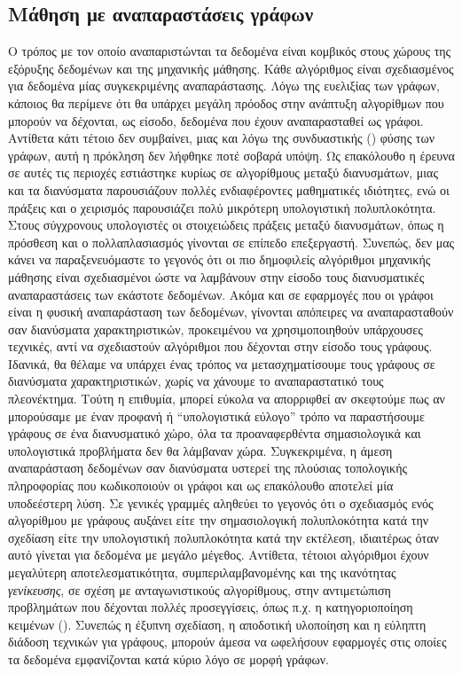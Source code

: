 \subsection{Μάθηση με αναπαραστάσεις γράφων}
Ο τρόπος με τον οποίο αναπαριστώνται τα δεδομένα είναι κομβικός στους χώρους της εξόρυξης δεδομένων και της μηχανικής μάθησης.
Κάθε αλγόριθμος είναι σχεδιασμένος για δεδομένα μίας συγκεκριμένης αναπαράστασης.
Λόγω της ευελιξίας των γράφων, κάποιος θα περίμενε ότι θα υπάρχει μεγάλη πρόοδος στην ανάπτυξη αλγορίθμων που μπορούν να δέχονται, ως είσοδο, δεδομένα που έχουν αναπαρασταθεί ως γράφοι.
Αντίθετα κάτι τέτοιο δεν συμβαίνει, μιας και λόγω της συνδυαστικής () φύσης των γράφων, αυτή η πρόκληση δεν λήφθηκε ποτέ σοβαρά υπόψη.
Ως επακόλουθο η έρευνα σε αυτές τις περιοχές εστιάστηκε κυρίως σε αλγορίθμους μεταξύ διανυσμάτων, μιας και τα διανύσματα παρουσιάζουν πολλές ενδιαφέροντες μαθηματικές ιδιότητες, ενώ οι πράξεις και ο χειρισμός παρουσιάζει πολύ μικρότερη υπολογιστική πολυπλοκότητα. Στους σύγχρονους υπολογιστές οι στοιχειώδεις πράξεις μεταξύ διανυσμάτων, όπως η πρόσθεση και ο πολλαπλασιασμός γίνονται σε επίπεδο επεξεργαστή.
Συνεπώς, δεν μας κάνει να παραξενευόμαστε το γεγονός ότι οι πιο δημοφιλείς αλγόριθμοι μηχανικής μάθησης είναι σχεδιασμένοι ώστε να λαμβάνουν στην είσοδο τους διανυσματικές αναπαραστάσεις των εκάστοτε δεδομένων. 
Ακόμα και σε εφαρμογές που οι γράφοι είναι η φυσική αναπαράσταση των δεδομένων, γίνονται απόπειρες να αναπαρασταθούν σαν διανύσματα χαρακτηριστικών, προκειμένου να χρησιμοποιηθούν υπάρχουσες τεχνικές, αντί να σχεδιαστούν αλγόριθμοι που δέχονται στην είσοδο τους γράφους.
Ιδανικά, θα θέλαμε να υπάρχει ένας τρόπος να μετασχηματίσουμε τους γράφους σε διανύσματα χαρακτηριστικών, χωρίς να χάνουμε το αναπαραστατικό τους πλεονέκτημα.
Τούτη η επιθυμία, μπορεί εύκολα να απορριφθεί αν σκεφτούμε πως αν μπορούσαμε με έναν προφανή ή ``υπολογιστικά εύλογο'' τρόπο να παραστήσουμε γράφους σε ένα διανυσματικό χώρο, όλα τα προαναφερθέντα σημασιολογικά και υπολογιστικά προβλήματα δεν θα λάμβαναν χώρα.
Συγκεκριμένα, η άμεση αναπαράσταση δεδομένων σαν διανύσματα υστερεί της πλούσιας τοπολογικής πληροφορίας που κωδικοποιούν οι γράφοι και ως επακόλουθο αποτελεί μία υποδεέστερη λύση.
Σε γενικές γραμμές αληθεύει το γεγονός ότι ο σχεδιασμός ενός αλγορίθμου με γράφους αυξάνει είτε την σημασιολογική πολυπλοκότητα κατά την σχεδίαση είτε την υπολογιστική πολυπλοκότητα κατά την εκτέλεση, ιδιαιτέρως όταν αυτό γίνεται για δεδομένα με μεγάλο μέγεθος.
Αντίθετα, τέτοιοι αλγόριθμοι έχουν μεγαλύτερη αποτελεσματικότητα, συμπεριλαμβανομένης και της ικανότητας \textit{γενίκευσης}, σε σχέση με ανταγωνιστικούς αλγορίθμους, στην αντιμετώπιση προβλημάτων που δέχονται πολλές προσεγγίσεις, όπως π.χ. η κατηγοριοποίηση κειμένων ().
Συνεπώς η έξυπνη σχεδίαση, η αποδοτική υλοποίηση και η εύληπτη διάδοση τεχνικών για γράφους, μπορούν άμεσα να ωφελήσουν εφαρμογές στις οποίες τα δεδομένα εμφανίζονται κατά κύριο λόγο σε μορφή γράφων.
